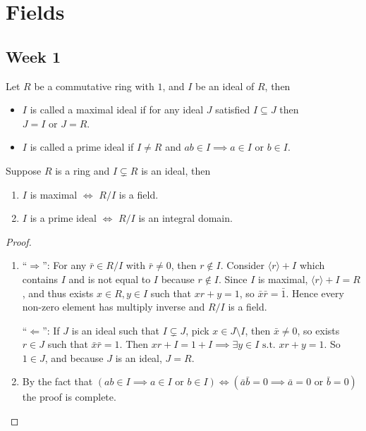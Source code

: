 \section{Fields}

\subsection{Week 1}

\begin{definition}
  Let $R$ be a commutative ring with $1$, and $I$ be an ideal of $R$, then
  \begin{itemize}
    \item $I$ is called a maximal ideal if for any ideal $J$ satisfied
      $I \subseteq J$ then $J = I \text{ or } J = R$.
    \item $I$ is called a prime ideal if $I \neq R$ and $ab \in I \implies a \in I \text{ or } b \in I$.
  \end{itemize}
\end{definition}

\begin{prop} \label{prop:max-prime-to-field-int-domain}
  Suppose $R$ is a ring and $I \subsetneq R$ is an ideal, then
  \begin{enumerate}
    \item $I$ is maximal $\iff$ $R / I$ is a field.
    \item $I$ is a prime ideal $\iff$ $R / I$ is an integral domain.
  \end{enumerate}

  \begin{proof} \hfill \vspace*{-1em}
    \begin{enumerate}
      \item ``$\Rightarrow$'': For any $\bar{r} \in R/I$ with $\bar{r} \neq 0$, then $r \not\in I$.
        Consider $\langle r \rangle + I$ which contains $I$ and is not equal to $I$ because $r \not\in I$.
        Since $I$ is maximal, $\langle r \rangle + I = R$, and thus exists $x \in R, y \in I$ such that
        $xr + y = 1$, so $\bar{x} \bar{r} = \bar{1}$. Hence every non-zero element has multiply inverse
        and $R / I$ is a field.

      ``$\Leftarrow$'': If $J$ is an ideal such that $I \subsetneq J$, pick $x \in J \setminus I$,
      then $\bar{x} \neq 0$, so exists $r \in J$ such that $\bar{x} \bar{r} = 1$. Then
      $xr + I = 1 + I \implies \exists y \in I \text{ s.t. } xr + y = 1$. So $1 \in J$, and
      because $J$ is an ideal, $J = R$.

      \item By the fact that $(ab \in I \implies a \in I \text{ or } b \in I) \iff
        (\bar{a}\bar{b} = 0 \implies \bar{a} = 0 \text{ or } \bar{b} = 0)$ the proof is complete.
    \end{enumerate}
  \end{proof}
\end{prop}

